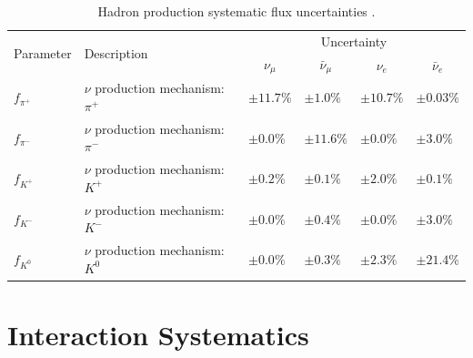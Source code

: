 \begin{table}[!h]
  \renewcommand{\arraystretch}{1.4}    
  \begin{tabular}{p{2cm} p{6.0cm} p{1.2cm} p{1.2cm} p{1.2cm} p{1.2cm}}
    \toprule
    \multirow{2}{*}{Parameter} & \multirow{2}{*}{Description} & \multicolumn{4}{c}{Uncertainty} \\
    && \multicolumn{1}{c}{$\nu_{\mu}$} & \multicolumn{1}{c}{$\bar{\nu}_{\mu}$} & \multicolumn{1}{c}{$\nu_{e}$} & \multicolumn{1}{c}{$\bar{\nu}_{e}$} \\
    \midrule

    $f_{\pi^{+}}$ & $\nu$ production mechanism: $\pi^{+}$ & $ \pm 11.7 \%$ & $ \pm 1.0 \%$ & $ \pm 10.7 \%$ & $ \pm 0.03 \%$ \\

    $f_{\pi^{-}}$ & $\nu$ production mechanism: $\pi^{-}$ & $ \pm 0.0 \%$ & $ \pm 11.6 \%$ & $ \pm 0.0 \%$ & $ \pm 3.0 \%$ \\

    $f_{K^{+}}$   & $\nu$ production mechanism: $K^{+}$ & $ \pm 0.2 \%$ & $ \pm 0.1 \%$ & $ \pm 2.0 \%$ & $ \pm 0.1 \%$ \\
                  
    $f_{K^{-}}$   & $\nu$ production mechanism: $K^{-}$ & $ \pm 0.0 \%$ & $ \pm 0.4 \%$ & $ \pm 0.0 \%$ & $ \pm 3.0 \%$ \\
                  
    $f_{K^{0}}$   & $\nu$ production mechanism: $K^{0}$ & $ \pm 0.0 \%$ & $ \pm 0.3 \%$ & $ \pm 2.3 \%$ & $ \pm 21.4 \%$ \\

    \bottomrule
  \end{tabular}
  \caption[Hadron production flux systematic parameters]{Hadron production systematic flux uncertainties \cite{BNB_flux_TN}.}
  \label{}
\end{table}


\section{Interaction Systematics}

